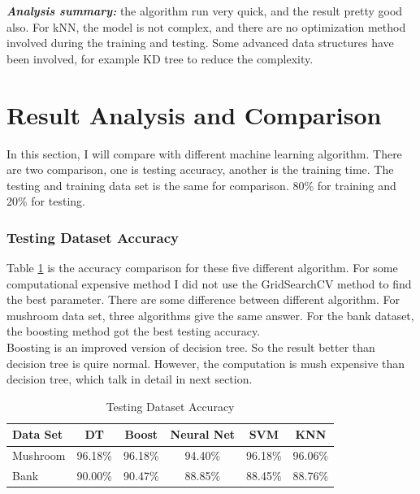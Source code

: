 \documentclass[10pt, conference, compsocconf]{IEEEtran}
\begin{document}
\textit{\textbf{Analysis summary:}} the algorithm run very quick, and the result pretty good also. For kNN, the model is not complex, and there are no optimization method involved during the training and testing. Some advanced data structures have been involved, for example KD tree to reduce the complexity. 
\section{Result Analysis and Comparison}
In this section, I will compare with different machine learning algorithm. There are two comparison, one is testing accuracy, another is the training time. The testing and training data set is the same for comparison. 80\% for training and 20\% for testing. 

\subsubsection{Testing Dataset Accuracy}
Table \ref{tab:accuracy} is the accuracy comparison for these five different algorithm. For some computational expensive method I did not use the GridSearchCV method to find the best parameter. There are some difference between different algorithm. For mushroom data set, three algorithms give the same answer. For the bank dataset, the boosting method got the best testing accuracy.\\
Boosting is an improved version of decision tree. So the result better than decision tree is quire normal. However, the computation is mush expensive than decision tree, which talk in detail in next section. 

\begin{table}[h]
	\centering
	\caption{Testing Dataset Accuracy}
	\label{tab:accuracy}
	\begin{tabular}{|l|c|c|c|c|c|}
		\hline
		Data Set & DT      & Boost   & Neural Net & SVM     & KNN     \\ \hline
		Mushroom & 96.18\% & 96.18\% & 94.40\%    & 96.18\% & 96.06\% \\ \hline
		Bank     & 90.00\% & 90.47\% & 88.85\%    & 88.45\% & 88.76\% \\ \hline
	\end{tabular}
\end{table}
\end{document}
